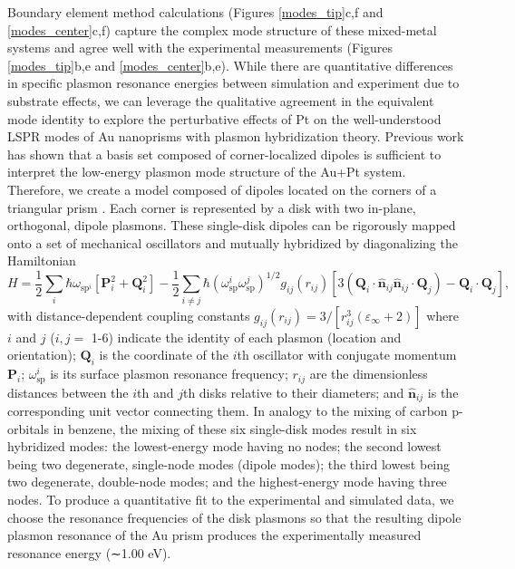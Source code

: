 \documentclass [11pt, proquest] {uwthesis}[2016/11/22]
\begin{document}
Boundary element method calculations \cite{Hohenester2012,Hohenester2014} (Figures \ref{modes_tip}c,f and \ref{modes_center}c,f) capture the complex mode structure of these mixed-metal systems and agree well with the experimental measurements (Figures \ref{modes_tip}b,e and \ref{modes_center}b,e). While there are quantitative differences in specific plasmon resonance energies between simulation and experiment due to substrate effects, we can leverage the qualitative agreement in the equivalent mode identity to explore the perturbative effects of Pt on the well-understood LSPR modes \cite{HohenesterDisk} of Au nanoprisms with plasmon hybridization theory. Previous work \cite{Nanodecahedra,Decahedra} has shown that a basis set composed of corner-localized dipoles is sufficient to interpret the low-energy plasmon mode structure of the Au+Pt system. Therefore, we create a model composed of dipoles located on the corners of a triangular prism \cite{Quillin,Zohar}. Each corner is represented by a disk with two in-plane, orthogonal, dipole plasmons. These single-disk dipoles can be rigorously mapped onto a set of mechanical oscillators and mutually hybridized by diagonalizing the Hamiltonian \cite{Cherqui2014}
\begin{equation}
H = \frac{1}{2}\sum_{i}\hbar\omega_{\textrm{sp}^i}[\textbf{P}_i^2 + \textbf{Q}_i^2] - \frac{1}{2}\sum_{i \neq j}\hbar(\omega_{\textrm{sp}}^i\omega_{\textrm{sp}}^j)^{1/2}g_{ij}(r_{ij})[3(\textbf{Q}_i\cdot\hat{\textbf{n}}_{ij}\hat{\textbf{n}}_{ij}\cdot\textbf{Q}_j)-\textbf{Q}_i\cdot\textbf{Q}_j],
\label{prism_hammy}
\end{equation}
with distance-dependent coupling constants $g_{ij}(r_{ij}) = 3/[r_{ij}^3(\varepsilon_{\infty} + 2)]$ where $i$ and $j$ ($i, j =$ 1-6) indicate the identity of each plasmon (location and orientation); $\textbf{Q}_i$ is the coordinate of the $i$th oscillator with conjugate momentum $\textbf{P}_i$; $\omega_{\textrm{sp}}^i$ is its surface plasmon resonance frequency; $r_{ij}$ are the dimensionless distances between the $i$th and $j$th disks relative to their diameters; and $\hat{\textbf{n}}_{ij}$ is the corresponding unit vector connecting them.
In analogy to the mixing of carbon p-orbitals in benzene, the mixing of these six single-disk modes result in six hybridized modes: the lowest-energy mode having no nodes; the second lowest being two degenerate, single-node modes (dipole modes); the third lowest being two degenerate, double-node modes; and the highest-energy mode having three nodes. To produce a quantitative fit to the experimental and simulated data, we choose the resonance frequencies of the disk plasmons so that the resulting dipole plasmon resonance of the Au prism produces the experimentally measured resonance energy (∼1.00 eV).
\end{document}
